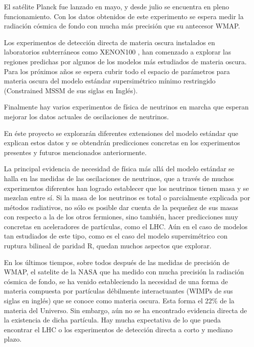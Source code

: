 El satélite Planck fue lanzado en mayo, y desde julio se encuentra en
pleno funcionamiento.  Con los datos obtenidos de este experimento se
espera medir la radiación cósmica de fondo con mucha más precisión que
su antecesor WMAP.

Los experimentos de detección directa de materia oscura instalados en
laboratorios subterráneos como XENON100 \cite{1104.3121}, han
comenzado a explorar las regiones predichas por algunos de los modelos
más estudiados de materia oscura. Para los próximos años se espera
cubrir todo el espacio de parámetros para materia oscura del modelo
estándar supersimétrico mínimo restringido (Constrained MSSM de sus
siglas en Inglés).

Finalmente hay varios experimentos de física de neutrinos en marcha
que esperan mejorar los datos actuales de oscilaciones de neutrinos.


En éste proyecto se explorarán diferentes extensiones del modelo
estándar que explican estos datos y se obtendrán predicciones
concretas en los experimentos presentes y futuros mencionados
anteriormente.

La principal evidencia de necesidad de física más allá del modelo
estándar se halla en las medidas de las oscilaciones de neutrinos,
que a través de muchos experimentos diferentes han logrado establecer
que los neutrinos tienen masa y se mezclan entre sí. Si la masa de los
neutrinos es total o parcialmente explicada por métodos radiativos, no
sólo es posible dar cuenta de la pequeñez de sus masas con respecto a
la de los otros fermiones, sino también, hacer predicciones muy
concretas en aceleradores de partículas, como el LHC. Aún en el caso
de modelos tan estudiados de este tipo, como es el caso del modelo
supersimétrico con ruptura bilineal de paridad R, quedan muchos
aspectos que explorar.

En los últimos tiempos, sobre todos después de las medidas de
precisión de WMAP, el satelite de la NASA que ha medido con mucha
precisión la radiación cósmica de fondo, se ha venido estableciendo la
necesidad de una forma de materia compuesta por partículas débilmente
interactuantes (WIMPs de sus siglas en inglés) que se conoce como
materia oscura. Esta forma el 22\% de la materia del Universo. Sin
embargo, aún no se ha encontrado evidencia directa de la existencia de
dicha partícula. Hay mucha expectativa de lo que pueda encontrar el
LHC o los experimentos de detección directa a corto y mediano plazo.

